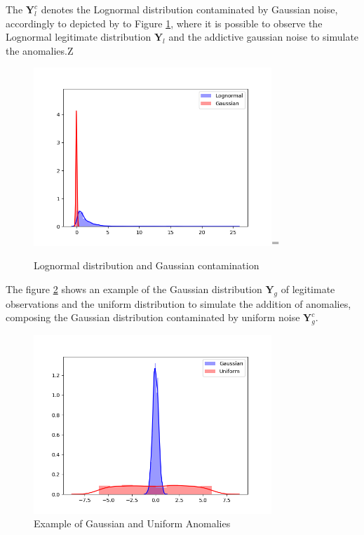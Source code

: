 \documentclass[review]{elsarticle}
\begin{document}
The $\pmb{Y}_l^c$ denotes the Lognormal distribution contaminated by Gaussian noise, accordingly to depicted by to Figure \ref{fig:4.02}, where it is possible to observe the Lognormal legitimate distribution $\pmb{Y}_l$ and the addictive gaussian noise to simulate the anomalies.Z

\begin{figure}[!htb]
	\centering
	\includegraphics[width=0.8\textwidth]{figures/4_Xlogng2.png}=
	\caption{Lognormal distribution and Gaussian contamination}
	\label{fig:4.02}
\end{figure}

The figure \ref{fig:4.03} shows an example of the Gaussian distribution $\pmb{Y}_g$ of legitimate observations and the uniform distribution to simulate the addition of anomalies, composing the Gaussian distribution contaminated by uniform noise $\pmb{Y}_g^c$.

\begin{figure}[h!]
	\centering
	\includegraphics[width=0.8\textwidth]{figures/4_Xgu2.png}
	\caption{Example of Gaussian and Uniform Anomalies}
	\label{fig:4.03}
\end{figure}
\end{document}
